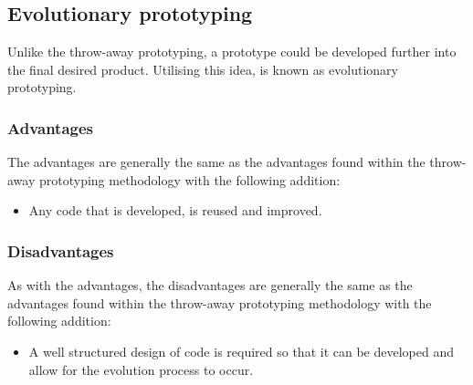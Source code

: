 \subsection{Evolutionary prototyping}
Unlike the throw-away prototyping, a prototype could be developed further into
the final desired product. Utilising this idea, is known as evolutionary 
prototyping.

\subsubsection{Advantages}
The advantages are generally the same as the advantages found within the 
throw-away prototyping methodology with the following addition:
\begin{itemize}
  \item Any code that is developed, is reused and improved.
\end{itemize}

\subsubsection{Disadvantages}
As with the advantages, the disadvantages are generally the same as the 
advantages found within the throw-away prototyping methodology with the 
following addition:
\begin{itemize}
  \item A well structured design of code is required so that it can be 
        developed and allow for the evolution process to occur.
\end{itemize}